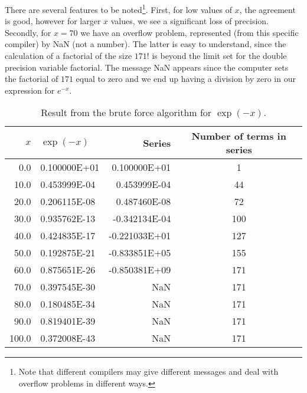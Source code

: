 There are several features to be noted\footnote{Note that different
compilers may give different messages and deal with overflow problems
in different ways.}. 
First, for low values of $x$, the agreement is good, 
however for larger $x$ values, we see a significant loss
of precision. Secondly, for $x=70$ we have an overflow problem,
represented (from this specific compiler) by NaN (not a number). 
The latter is easy to understand, since the calculation of a
factorial of the size $171!$ is beyond the limit set for the
double precision variable factorial. The message NaN appears since
the computer sets the factorial of $171$ equal to zero and we end
up having a division by zero in our expression for
$e^{-x}$.  
%
\begin{table}[hbtp]
\label{num-tab1}
\begin{center}
\begin{tabular}{rlrc}\\\hline
$x$&$\exp{(-x)}$&Series&Number of terms in series\\\hline
  0.0& 0.100000E+01& 0.100000E+01&    1\\
 10.0& 0.453999E-04& 0.453999E-04 &  44\\
 20.0& 0.206115E-08& 0.487460E-08&   72\\
 30.0& 0.935762E-13& -0.342134E-04 & 100\\
 40.0& 0.424835E-17& -0.221033E+01&  127\\
 50.0& 0.192875E-21& -0.833851E+05&  155\\
 60.0& 0.875651E-26& -0.850381E+09&  171\\
 70.0& 0.397545E-30&         NaN&  171\\
 80.0& 0.180485E-34&         NaN&  171\\
 90.0& 0.819401E-39 &        NaN&  171\\
100.0& 0.372008E-43&         NaN&  171\\    \hline
\end{tabular} 
\caption{Result  from the brute force algorithm for $\exp{(-x)}$.}
\end{center} 
\end{table}     



